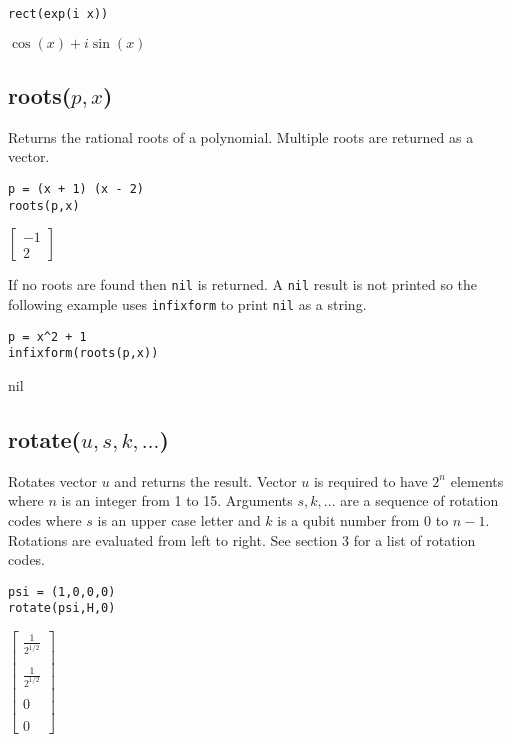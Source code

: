 {\color{blue}
\begin{verbatim}
rect(exp(i x))
\end{verbatim}
}

\noindent
$\displaystyle \cos(x)+i\sin(x)$

\subsection*{roots($p,x$)}

Returns the rational roots of a polynomial.
Multiple roots are returned as a vector.

{\color{blue}
\begin{verbatim}
p = (x + 1) (x - 2)
roots(p,x)
\end{verbatim}
}

\noindent
$\displaystyle
\begin{bmatrix}
-1
\\[1ex]
2
\end{bmatrix}
$

\bigskip
\noindent
If no roots are found then \verb$nil$ is returned.
A \verb$nil$ result is not printed so the following example uses
\verb$infixform$ to print \verb$nil$ as a string.

{\color{blue}
\begin{verbatim}
p = x^2 + 1
infixform(roots(p,x))
\end{verbatim}
}

\noindent
nil

\subsection*{rotate($u,s,k,\ldots$)}
Rotates vector $u$ and returns the result.
Vector $u$ is required to have $2^n$ elements where
$n$ is an integer from 1 to 15.
Arguments $s,k,\ldots$ are a sequence of rotation codes
where $s$ is an upper case letter and $k$ is a qubit number
from 0 to $n-1$.
Rotations are evaluated from left to right.
See section 3 for a list of rotation codes.

{\color{blue}
\begin{verbatim}
psi = (1,0,0,0)
rotate(psi,H,0)
\end{verbatim}
}

\noindent
$\displaystyle
\begin{bmatrix}
{\displaystyle \frac{1}{2^{1/2}}}
\\
\\
{\displaystyle \frac{1}{2^{1/2}}}
\\
\\
0
\\
\\
0
\end{bmatrix}
$

